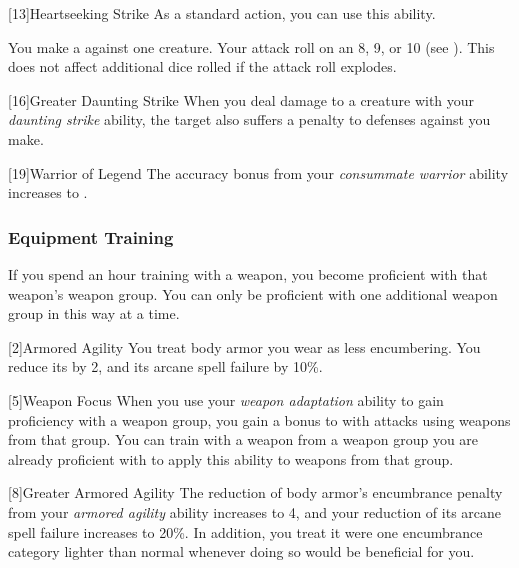             [13]{Heartseeking Strike} As a standard action, you can use this ability.
            \begin{ability}
                \begin{spelleffects}
                    \spelleffect You make a  against one creature.
                    Your attack roll  on an 8, 9, or 10 (see ).
                    This does not affect additional dice rolled if the attack roll explodes.
                \end{spelleffects}
            \end{ability}

            [16]{Greater Daunting Strike}
            When you deal damage to a creature with your \textit{daunting strike} ability, the target also suffers a  penalty to defenses against  you make.

            [19]{Warrior of Legend}
            The accuracy bonus from your \textit{consummate warrior} ability increases to .

        \subsubsection{Equipment Training}
            If you spend an hour training with a weapon, you become proficient with that weapon's weapon group.
            You can only be proficient with one additional weapon group in this way at a time.

            [2]{Armored Agility}
            You treat body armor you wear as less encumbering.
            You reduce its  by 2, and its arcane spell failure by 10\%.

            [5]{Weapon Focus} 
            When you use your \textit{weapon adaptation} ability to gain proficiency with a weapon group, you gain a  bonus to  with attacks using weapons from that group.
            You can train with a weapon from a weapon group you are already proficient with to apply this ability to weapons from that group.

            [8]{Greater Armored Agility}
            The reduction of body armor's encumbrance penalty from your \textit{armored agility} ability increases to 4, and your reduction of its arcane spell failure increases to 20\%.
            In addition, you treat it were one encumbrance category lighter than normal whenever doing so would be beneficial for you.

